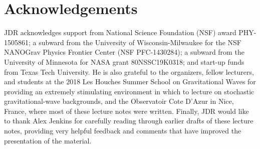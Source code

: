 \section*{Acknowledgements}
\label{s:acknowledgements}

JDR acknowledges support from National Science Foundation (NSF)
award PHY-1505861; a subward from the University of Wisconsin-Milwaukee
for the NSF NANOGrav Physics Frontier Center (NSF PFC-1430284); 
a subward from the University of Minnesota for NASA grant 80NSSC19K0318; 
and start-up funds from Texas Tech University.
He is also grateful to the organizers, fellow lecturers, and students
at the 2018 Les Houches Summer School on Gravitational Waves for 
providing an extremely stimulating environment in which to lecture on 
stochastic gravitational-wave backgrounds, and the Observatoir Cote
D'Azur in Nice, France, where most of these lecture notes were written.
Finally, JDR would like to thank Alex Jenkins for carefully reading 
through earlier drafts of these lecture notes, providing very helpful
feedback and comments that have improved the presentation of the material.
 
